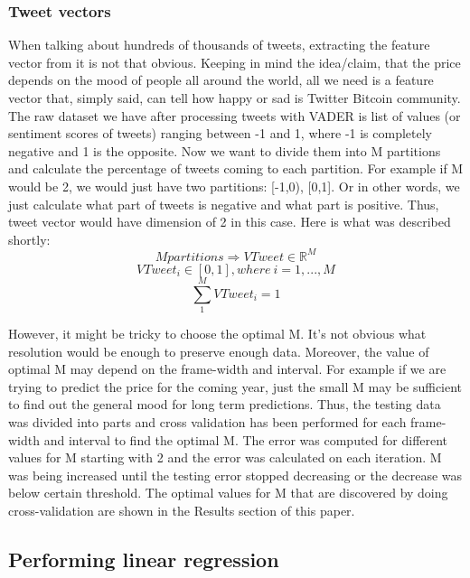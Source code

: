\documentclass[a4paper,11pt,oneside]{article}
\begin{document}
  \subsubsection{Tweet vectors}\label{tweetvectors}
  
  When talking about hundreds of thousands of tweets, extracting the feature vector from it is not that obvious. Keeping in mind the idea/claim, that the price depends on the mood of people all around the world, all we need is a feature vector that, simply said, can tell how happy or sad is Twitter Bitcoin community. The raw dataset we have after processing tweets with VADER is list of values (or sentiment scores of tweets) ranging between -1 and 1, where -1 is completely negative and 1 is the opposite. Now we want to divide them into M partitions and calculate the percentage of tweets coming to each partition. For example if M would be 2, we would just have two partitions: [-1,0), [0,1]. Or in other words, we just calculate what part of tweets is negative and what part is positive. Thus, tweet vector would have dimension of 2 in this case. Here is what was described shortly:
  \begin{equation}\label{partitionsInTweetVector}
	  M partitions \Rightarrow VTweet \in \mathbb{R}^M 
  \end{equation}
  \begin{equation}
	  VTweet_i \in [0, 1], where\ i = 1,..., M
  \end{equation}
  \begin{equation}
	  \sum_{1}^{M} VTweet_i = 1
  \end{equation}
	  
  However, it might be tricky to choose the optimal M. It's not obvious what resolution would be enough to preserve enough data. Moreover, the value of optimal M may depend on the frame-width and interval. For example if we are trying to predict the price for the coming year, just the small M may be sufficient to find out the general mood for long term predictions. Thus, the testing data was divided into parts and cross validation has been performed for each frame-width and interval to find the optimal M. The error was computed for different values for M starting with 2 and the error was calculated on each iteration. M was being increased until the testing error stopped decreasing or the decrease was below certain threshold. The optimal values for M that are discovered by doing cross-validation are shown in the Results section of this paper.
  
  
  \subsection{Performing linear regression}
  
\end{document}
